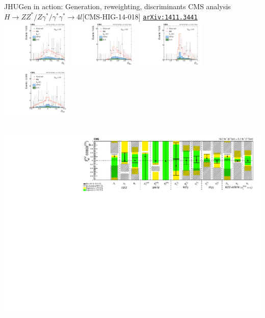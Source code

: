 \documentclass[usenames,dvipsnames,svgnames,table]{beamer}
\newcommand{\arxiv}[1]{\href{http://arxiv.org/abs/#1}{\nolinkurl{arXiv:#1}}}
\begin{document}
\begin{frame}{JHUGen in action: Generation, reweighting, discriminants}{
CMS analysis $H \to ZZ^*/Z\gamma^*/\gamma^*\gamma^* \to 4l$\hfill [CMS-HIG-14-018] \arxiv{1411.3441}
}
\includegraphics[width=0.25\textwidth]{HVV/d0minus}
\includegraphics[width=0.25\textwidth]{HVV/d0hplus}
\includegraphics[width=0.25\textwidth]{HVV/dlambda1}
\includegraphics[width=0.25\textwidth]{HVV/dcp}
\\
\begin{columns}
\begin{column}{0.6\textwidth}
\includegraphics[width=\textwidth]{HVV/summary_a2a3lambda1}

\end{column}
\end{columns}
\end{frame}
\end{document}
